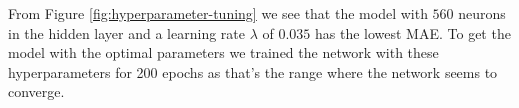 \begin{Figure}
    \centering
    
    \captionsetup{width=.9\linewidth}
    \label{fig:hyperparameter-tuning}
\end{Figure}

From Figure \ref{fig:hyperparameter-tuning} we see that the model with $560$ neurons in the hidden layer and a learning rate $\lambda$ of $0.035$ has the lowest MAE. To get the model with the optimal parameters we trained the network with these hyperparameters for 200 epochs as that's the range where the network seems to converge.

